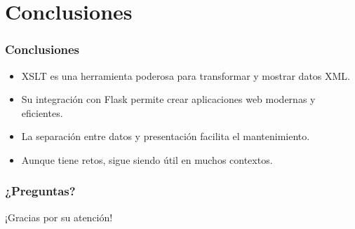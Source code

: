 \documentclass{beamer}
\begin{document}
\section{Conclusiones}


\begin{frame}
\frametitle{Conclusiones}
\begin{itemize}
    \item XSLT es una herramienta poderosa para transformar y mostrar datos XML.
    \item Su integración con Flask permite crear aplicaciones web modernas y eficientes.
    \item La separación entre datos y presentación facilita el mantenimiento.
    \item Aunque tiene retos, sigue siendo útil en muchos contextos.
\end{itemize}
\end{frame}

\begin{frame}
\frametitle{¿Preguntas?}
\begin{center}
\Huge ¡Gracias por su atención!
\end{center}
\end{frame}
\end{document}
